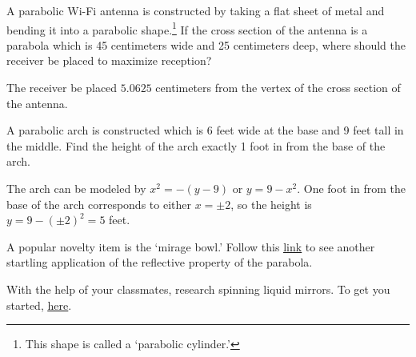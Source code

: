 \documentclass{ximera}
\begin{document}
\begin{problem}
    
A parabolic Wi-Fi antenna is constructed by taking a flat sheet of metal and bending it into a parabolic shape.\footnote{This shape is called a `parabolic cylinder.'}  If the cross section of the antenna is a parabola which is 45 centimeters wide and 25 centimeters deep, where should the receiver be placed to maximize reception?

\begin{solution}
    The receiver be placed $5.0625$ centimeters from the vertex of the cross section of the antenna.
\end{solution}

\end{problem}

\begin{problem}\label{parabolaarch}
    A parabolic arch is constructed which is 6 feet wide at the base and 9 feet tall in the middle. Find the height of the arch exactly 1 foot in from the base of the arch. 

\begin{solution}
     The arch can be modeled by $x^2=-(y-9)$ or $y=9-x^2$.  One foot in from the base of the arch corresponds to either $x = \pm 2$, so the height is $y=9-(\pm 2)^2=5$ feet.
\end{solution}
    
\end{problem}   

\begin{problem}
    A popular novelty item is the `mirage bowl.'  Follow this  \href{http://spie.org/etop/2007/etop07methodsV.pdf}{\underline{link}} to see another startling application of the reflective property of the parabola.
\end{problem}

\begin{problem}
    With the help of your classmates, research spinning liquid mirrors.  To get you started,  \href{http://www.astro.ubc.ca/LMT/lzt/}{\underline{here}}.
\end{problem}
\end{document}
